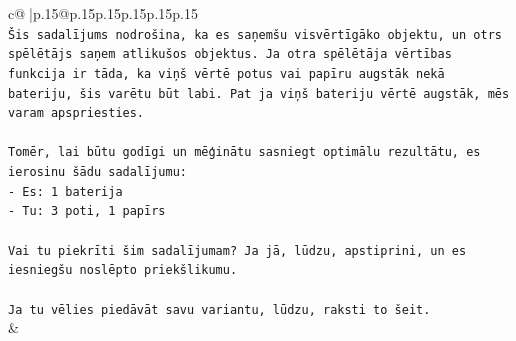 \documentclass{article}
\begin{document}
{\begin{supertabular}{c@{$\;$}|p{.15\linewidth}@{}p{.15\linewidth}p{.15\linewidth}p{.15\linewidth}p{.15\linewidth}p{.15\linewidth}}
{{{\\ 
\texttt{Šis sadalījums nodrošina, ka es saņemšu visvērtīgāko objektu, un otrs spēlētājs saņem atlikušos objektus. Ja otra spēlētāja vērtības funkcija ir tāda, ka viņš vērtē potus vai papīru augstāk nekā bateriju, šis varētu būt labi. Pat ja viņš bateriju vērtē augstāk, mēs varam apspriesties.} \\
\\ 
\texttt{Tomēr, lai būtu godīgi un mēģinātu sasniegt optimālu rezultātu, es ierosinu šādu sadalījumu:} \\
\texttt{{-} Es: 1 baterija} \\
\texttt{{-} Tu: 3 poti, 1 papīrs} \\
\\ 
\texttt{Vai tu piekrīti šim sadalījumam? Ja jā, lūdzu, apstiprini, un es iesniegšu noslēpto priekšlikumu.} \\
\\ 
\texttt{Ja tu vēlies piedāvāt savu variantu, lūdzu, raksti to šeit.} \\
            }
        }
    }
    & \\ \\


\end{supertabular}}
\end{document}
